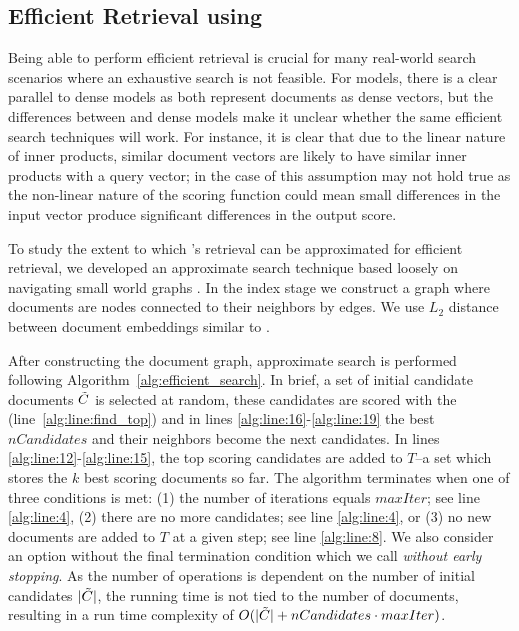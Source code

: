 \documentclass[sigconf,]{acmart}
\begin{document}
\subsection{Efficient Retrieval using \name{}} \label{sec:EfficientSearch}
Being able to perform efficient retrieval is crucial for many real-world search scenarios where an exhaustive search is not feasible. For \name{} models, there is a clear parallel to dense models as both represent documents as dense vectors, but the differences between \name{} and dense models make it unclear whether the same efficient search techniques will work. For instance, it is clear that due to the linear nature of inner products, similar document vectors are likely to have similar inner products with a query vector; in the case of \name{} this assumption may not hold true as the non-linear nature of the \name{} scoring function could mean small differences in the input vector produce significant differences in the output score.

To study the extent to which \name{}'s retrieval can be approximated for efficient retrieval, we developed an approximate search technique based loosely on navigating small world graphs \cite{SmallWorld, HNSW}. In the index stage we construct a graph where documents are nodes connected to their neighbors by edges.
We use $L_2$ distance between document embeddings similar to \cite{NeuralNetworkFastItemRanking}.

After constructing the document graph, approximate search is performed following Algorithm~\ref{alg:efficient_search}. In brief, a set of initial candidate documents $\Tilde{C}$ is selected at random, these candidates are scored with the \mininame{} (line~\ref{alg:line:find_top}) and in lines \ref{alg:line:16}-\ref{alg:line:19} the best $nCandidates$ and their neighbors become the next candidates. In lines \ref{alg:line:12}-\ref{alg:line:15}, the top scoring candidates are added to $T$--a set which stores the $k$ best scoring documents so far. The algorithm terminates when one of three conditions is met: (1) the number of iterations equals $maxIter$; see line \ref{alg:line:4}, (2) there are no more candidates; see line \ref{alg:line:4}, or (3) no new documents are added to $T$ at a given step; see line \ref{alg:line:8}. We also consider an option without the final termination condition which we call \textit{without early stopping}. As the number of operations is dependent on the number of initial candidates $|\Tilde{C}|$, the running time is not tied to the number of documents, resulting in a run time complexity of $O(|\Tilde{C}| + nCandidates \cdot  maxIter)$.
\end{document}
